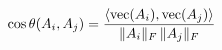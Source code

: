 \documentclass[preview]{standalone}
\begin{document}
\begin{align*}
\special{dvisvgm:raw <g id='unique000'>}\cos\theta(A_i, A_j) = \frac{\langle \mathrm{vec}(A_i),\mathrm{vec}(A_j)\rangle}{\|A_i\|_F\,\|A_j\|_F}\special{dvisvgm:raw </g>}
\end{align*}
\end{document}
